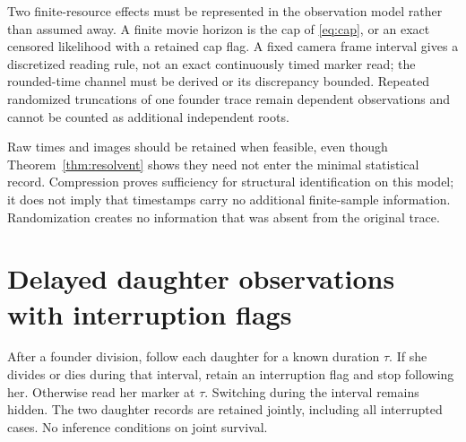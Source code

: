\documentclass[11pt]{article}
\theoremstyle{definition}
\begin{document}
Two finite-resource effects must be represented in the observation model rather
than assumed away. A finite movie horizon is the cap of \eqref{eq:cap}, or an
exact censored likelihood with a retained cap flag. A fixed camera frame
interval gives a discretized reading rule, not an exact continuously timed
marker read; the rounded-time channel must be derived or its discrepancy
bounded. Repeated randomized truncations of one founder trace remain dependent
observations and cannot be counted as additional independent roots.

Raw times and images should be retained when feasible, even though
Theorem~\ref{thm:resolvent} shows they need not enter the minimal statistical
record. Compression proves sufficiency for structural identification on this
model; it does not imply that timestamps carry no additional finite-sample
information. Randomization creates no information that was absent from the
original trace.

\section{Delayed daughter observations with interruption flags}
After a founder division, follow each daughter for a known duration $\tau$. If
she divides or dies during that interval, retain an interruption flag and stop
following her. Otherwise read her marker at $\tau$. Switching during the
interval remains hidden. The two daughter records are retained jointly,
including all interrupted cases. No inference conditions on joint survival.
\end{document}

